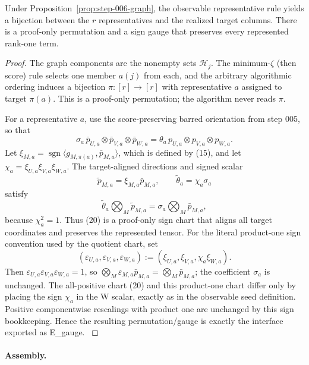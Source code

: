 \begin{lemma}\label{lem:step-006-gauge}
Under Proposition~\ref{prop:step-006-graph},
the observable representative rule yields a bijection between the \(r\)
representatives and the realized target columns. There is a proof-only
permutation and a sign gauge that preserves every represented rank-one term.

\begin{proof}
The graph components are the nonempty sets \(\mathcal H_j\). The
minimum-\(\zeta\) (then score) rule selects one member \(a(j)\) from each,
and the arbitrary algorithmic ordering induces a bijection
\(\pi:[r]\to[r]\) with representative \(a\) assigned to target
\(\pi(a)\). This is a proof-only permutation; the algorithm never reads
\(\pi\).

For a representative \(a\), use the score-preserving barred orientation from
step 005, so that
\[
 \sigma_a\,\bar p_{U,a}\otimes\bar p_{V,a}\otimes\bar p_{W,a}
 =\theta_a\,p_{U,a}\otimes p_{V,a}\otimes p_{W,a}. \tag{19}
\]
Let \(\xi_{M,a}=\operatorname{sgn}\langle g_{M,\pi(a)},\bar p_{M,a}\rangle\),
which is defined by (15), and let \(\chi_a=\xi_{U,a}\xi_{V,a}\xi_{W,a}\).
The target-aligned directions and signed scalar
\[
 \widetilde p_{M,a}=\xi_{M,a}\bar p_{M,a},\qquad
 \widetilde\theta_a=\chi_a\sigma_a \tag{20}
\]
satisfy
\[
 \widetilde\theta_a\bigotimes_M\widetilde p_{M,a}
 =\sigma_a\bigotimes_M\bar p_{M,a}, \tag{21}
\]
because \(\chi_a^2=1\). Thus (20) is a proof-only sign chart that aligns
all target coordinates and preserves the represented tensor. For the literal
product-one sign convention used by the quotient chart, set
\[
 (\varepsilon_{U,a},\varepsilon_{V,a},\varepsilon_{W,a})
 :=(\xi_{U,a},\xi_{V,a},\chi_a\xi_{W,a}).
\]
Then \(\varepsilon_{U,a}\varepsilon_{V,a}\varepsilon_{W,a}=1\), so
\(\bigotimes_M\varepsilon_{M,a}\bar p_{M,a}
=\bigotimes_M\bar p_{M,a}\); the coefficient \(\sigma_a\) is unchanged.
The all-positive chart (20) and this product-one chart differ only by
placing the sign \(\chi_a\) in the W scalar, exactly as in the observable
seed definition. Positive componentwise rescalings with product one are
unchanged by this sign bookkeeping. Hence the resulting permutation/gauge is
exactly the interface exported as E\_gauge. \(\)

\end{proof}
\end{lemma}
\paragraph{Assembly.}

